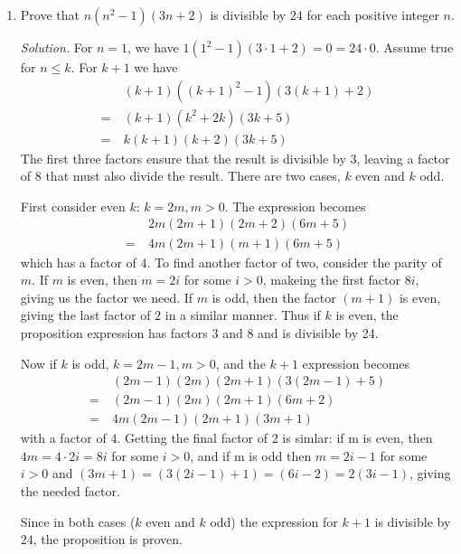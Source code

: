 \documentclass[12pt]{article}
\newcommand\sol[1]{\begin{mdframed}
\emph{Solution.} #1
\end{mdframed}}
\begin{document}
\begin{enumerate}
  \item Prove that $n(n^2 -1)(3n+2)$ is divisible by $24$ for each
    positive integer $n$.
    \sol{For $n=1$, we have $1(1^2 - 1)(3\cdot1 + 2) = 0 = 24\cdot0$.
      Assume true for $n \le k$. For $k+1$ we have
      \begin{align*}
           & (k+1)((k+1)^2 - 1)(3(k+1) + 2) \\
        =\ & (k+1)(k^2 + 2k)(3k + 5) \\
        =\ & k(k+1)(k+2)(3k+5)         
      \end{align*}
      The first three factors ensure that the result is divisible by
      $3$, leaving a factor of 8 that must also divide the result.
      There are two cases, $k$ even and $k$ odd.

      First consider even $k$: $k = 2m, m >0 $. The expression becomes
      \begin{align*}
          & 2m(2m+1)(2m+2)(6m+5) \\
        =\ & 4m(2m+1)(m+1)(6m+5)
      \end{align*}
      which has a factor of $4$. To find another factor of two,
      consider the parity of $m$. If $m$ is even, then $m=2i$ for some
      $i>0$, makeing the first factor $8i$, giving us the factor we
      need. If $m$ is odd, then the factor $(m+1)$ is even, giving the
      last factor of $2$ in a similar manner. Thus if $k$ is even, the
      proposition expression has factors $3$ and $8$ and is divisible
      by 24.

      Now if $k$ is odd, $k = 2m-1, m>0$, and the $k+1$ expression becomes
      \begin{align*}
        & (2m-1)(2m)(2m+1)(3(2m-1) + 5) \\
        =\ & (2m-1)(2m)(2m+1)(6m+2) \\
        =\ & 4m(2m-1)(2m+1)(3m+1)
      \end{align*}
      with a factor of $4$. Getting the final factor of 2 is simlar:
      if m is even, then $4m = 4\cdot2i = 8i$ for some $i>0$, and if m
      is odd then $m = 2i-1$ for some $i > 0$ and $(3m+1) = (3(2i-1) +
      1) = (6i-2) = 2(3i-1)$, giving the needed factor.
      
      Since in both cases ($k$ even and $k$ odd) the expression for
      $k+1$ is divisible by $24$, the proposition is proven.  }


\end{enumerate}
\end{document}
